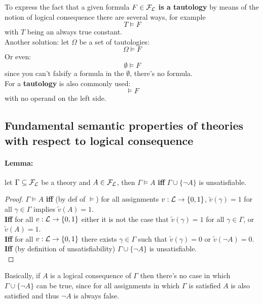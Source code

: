 	\vfill

	To express the fact that a given formula $F \in \mathcal{F}_\mathcal{L}$ \textbf{is a tautology} by means of the notion of logical consequence there are several ways, for example
	$$ T \models F $$
	with $T$ being an always true constant.\\
	Another solution: let $\Omega$ be a set of tautologies:
	$$\Omega \models F$$
	Or even:
	$$ \emptyset \models F$$
	since you can't falsify a formula in the $\emptyset$, there's no formula.\\
	For a \textbf{tautology} is also commonly used:
	$$ \models F$$
	with no operand on the left side.\\

	\newpage

	\subsection{Fundamental semantic properties of theories with respect to logical consequence}

	\paragraph{Lemma:} let $\Gamma \subseteq \mathcal{F}_\mathcal{L}$ be a theory and $A \in \mathcal{F}_\mathcal{L}$, then $\Gamma \models A$ \textbf{iff} $\Gamma \cup \{\neg A\}$ is unsatisfiable.\\

	\begin{proof}
		$\Gamma \models A$ \textbf{iff} (by def of $\models$) for all assignments $v: \mathcal{L} \rightarrow \{0,1\}$, $\tilde{v} (\gamma) =1$ for all $\gamma \in \Gamma$ implies $\tilde{v} (A) = 1$.\\

		\textbf{Iff} for all $v: \mathcal{L} \rightarrow \{0,1\}$ either it is not the case that $\tilde{v} (\gamma) = 1$ for all $\gamma \in \Gamma$, or $\tilde{v} (A) = 1$.\\

		\textbf{Iff} for all $v: \mathcal{L} \rightarrow \{0,1\}$ there exists $\gamma \in \Gamma$ such that $\tilde{v} (\gamma) = 0$ or $\tilde{v} (\neg A) = 0$.\\

		\textbf{Iff} (by definition of unsatisfiability) $\Gamma \cup \{\neg A\}$ is unsatisfiable.\\
	\end{proof}

	Basically, if $A$ is a logical consequence of $\Gamma$ then there's no case in which  $\Gamma \cup \{\neg A\}$ can be true, since for all assignments in which $\Gamma$ is satisfied $A$ is also satisfied and thus $\neg A$ is always false.\\

